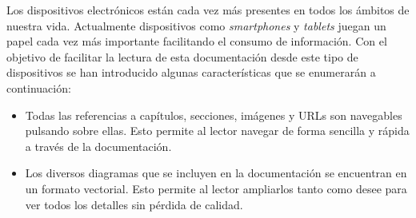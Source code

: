 Los dispositivos electrónicos están cada vez más presentes en todos los ámbitos de nuestra vida.  Actualmente dispositivos como \textit{smartphones} y \textit{tablets} juegan un papel cada vez más importante facilitando el consumo de información.  Con el objetivo de facilitar la lectura de esta documentación desde este tipo de dispositivos se han introducido algunas características que se enumerarán a continuación:
\begin{itemize}
	\item
		Todas las referencias a capítulos, secciones, imágenes y URLs son navegables pulsando sobre ellas.  Esto permite al lector navegar de forma sencilla y rápida a través de la documentación.
	\item
		Los diversos diagramas que se incluyen en la documentación se encuentran en un formato vectorial.  Esto permite al lector ampliarlos tanto como desee para ver todos los detalles sin pérdida de calidad.
\end{itemize}